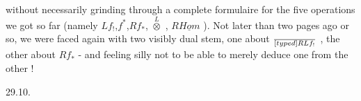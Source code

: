 without necessarily grinding through a complete formulaire for the
five  operations we got so far (namely $Lf_{!}$,$f^{*}$,$Rf_{*}$, $\overset{L}{\otimes}$ , $R\underline{Hom}$ ). Not
later than two pages ago or so, we were faced again with two visibly
dual stem, one about $\over[typed]{R}{L}f_{!}$ , the other about $Rf_{*}$ - and feeling
silly not to be able to merely deduce one from the other !

29.10.

